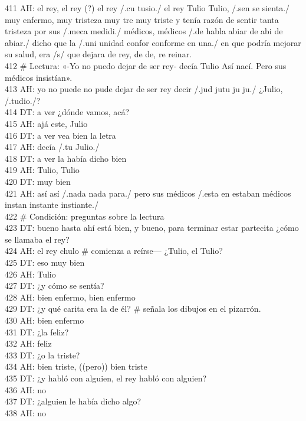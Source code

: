 411 AH: el rey, el rey (?) el rey /.cu tusio./ el rey Tulio Tulio, /.sen se sienta./ muy enfermo, muy tristeza muy tre muy triste y tenía razón de sentir tanta tristeza por sus /.meca medidi./ médicos, médicos /.de habla abiar de abi de abiar./ dicho que la /.uni unidad confor conforme en una./ en que podría mejorar su salud, era /s/ que dejara de rey, de de, re reinar.\\
412 \# Lectura: «-Yo no puedo dejar de ser rey- decía Tulio Así nací. Pero sus médicos insistían».\\
413 AH: yo no puede no pude dejar de ser rey decir /.jud jutu ju ju./ ¿Julio, /.tudio./?\\
414 DT: a ver ¿dónde vamos, acá?\\
415 AH: ajá este, Julio\\
416 DT: a ver vea bien la letra\\
417 AH: decía /.tu Julio./\\
418 DT: a ver la había dicho bien\\
419 AH: Tulio, Tulio\\
420 DT: muy bien\\
421 AH: así así /.nada nada para./ pero sus médicos /.esta en estaban médicos instan instante instiante./\\
422 \# Condición: preguntas sobre la lectura\\
423 DT: bueno hasta ahí está bien, y bueno, para terminar estar partecita ¿cómo se llamaba el rey?\\
424 AH: el rey chulo \# comienza a reírse--- ¿Tulio, el Tulio?\\
425 DT: eso muy bien\\
426 AH: Tulio\\
427 DT: ¿y cómo se sentía?\\
428 AH: bien enfermo, bien enfermo\\
429 DT: ¿y qué carita era la de él? \# señala los dibujos en el pizarrón.\\
430 AH: bien enfermo\\
431 DT: ¿la feliz?\\
432 AH: feliz\\
433 DT: ¿o la triste?\\
434 AH: bien triste, ((pero)) bien triste\\
435 DT: ¿y habló con alguien, el rey habló con alguien?\\
436 AH: no\\
437 DT: ¿alguien le había dicho algo?\\
438 AH: no\\
